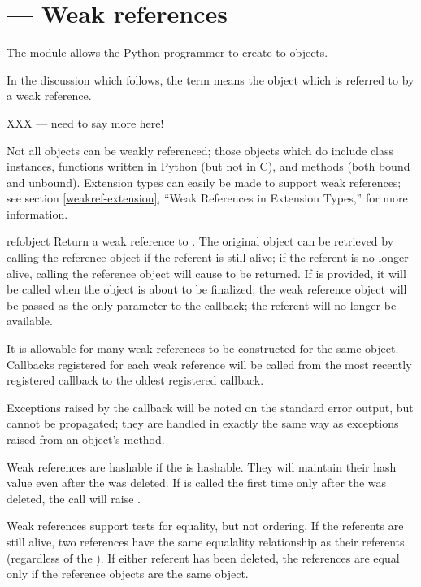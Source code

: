 \section{ ---
         Weak references}




The  module allows the Python programmer to create
 to objects.

In the discussion which follows, the term  means the
object which is referred to by a weak reference.

XXX --- need to say more here!

Not all objects can be weakly referenced; those objects which do
include class instances, functions written in Python (but not in C),
and methods (both bound and unbound).  Extension types can easily
be made to support weak references; see section \ref{weakref-extension},
``Weak References in Extension Types,'' for more information.


\begin{funcdesc}{ref}{object}
  Return a weak reference to .  The original object can be
  retrieved by calling the reference object if the referent is still
  alive; if the referent is no longer alive, calling the reference
  object will cause  to be returned.  If  is
  provided, it will be called when the object is about to be
  finalized; the weak reference object will be passed as the only
  parameter to the callback; the referent will no longer be available.

  It is allowable for many weak references to be constructed for the
  same object.  Callbacks registered for each weak reference will be
  called from the most recently registered callback to the oldest
  registered callback.

  Exceptions raised by the callback will be noted on the standard
  error output, but cannot be propagated; they are handled in exactly
  the same way as exceptions raised from an object's
   method.
  
  Weak references are hashable if the  is hashable.  They
  will maintain their hash value even after the  was
  deleted.  If  is called the first time only after
  the  was deleted, the call will raise
  .
  
  Weak references support tests for equality, but not ordering.  If
  the referents are still alive, two references have the same
  equalality relationship as their referents (regardless of the
  ).  If either referent has been deleted, the
  references are equal only if the reference objects are the same
  object.
\end{funcdesc}

